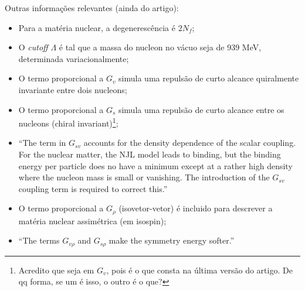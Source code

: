 Outras informações relevantes (ainda do artigo):
\begin{itemize}
	\item Para a matéria nuclear, a degenerescência é $2 N_f$;
	\item O \emph{cutoff} $\Lambda$ é tal que a massa do nucleon no vácuo seja de 939 MeV, determinada variacionalmente;
	\item O termo proporcional a $G_v$ simula uma repulsão de curto alcance quiralmente invariante entre dois nucleons;
	\item O termo proporcional a $G_s$ simula uma repulsão de curto alcance entre os nucleons (chiral invariant)\footnote{Acredito que seja em $G_v$, pois é o que consta na última versão do artigo. De qq forma, se um é isso, o outro é o que?};
	\item ``The term in $G_{sv}$ accounts for the density dependence of the scalar coupling. For the nuclear matter, the NJL model leads to binding, but the binding energy per particle does no have a minimum except at a rather high density where the nucleon mass is small or vanishing. The introduction of the $G_{sv}$ coupling term is required to correct this.''
	\item O termo proporcional a $G_\rho$ (isovetor-vetor) é incluido para descrever a matéria nuclear assimétrica (em isospin);
	\item ``The terms $G_{v\rho}$ and $G_{s\rho}$ make the symmetry energy softer.''
\end{itemize}

